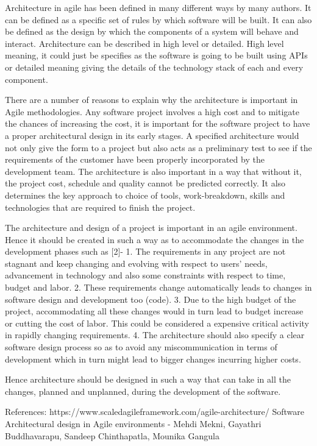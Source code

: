 Architecture in agile has been defined in many different ways by many authors. It can be defined as a specific set of rules by which software will be built. It can also be defined as the design by which the components of a system will behave and interact. Architecture can be described in high level or detailed. High level meaning, it could just be specifies as the software is going to be built using APIs or detailed meaning giving the details of the technology stack of each and every component.

There are a number of reasons to explain why the architecture is important in Agile methodologies. Any software project involves a high cost and to mitigate the chances of increasing the cost, it is important for the software project to have a proper architectural design in its early stages. A specified architecture would not only give the form to a project but also acts as a preliminary test to see if the requirements of the customer have been properly incorporated by the development team. The architecture is also important in a way that without it, the project cost, schedule and quality cannot be predicted correctly. It also determines the key approach to choice of tools, work-breakdown, skills and technologies that are required to finish the project.

The architecture and design of a project is important in an agile environment. Hence it should be created in such a way as to accommodate the changes in the development phases such as [2]-
1. The requirements in any project are not stagnant and keep changing and evolving with respect to users’ needs, advancement in technology and also some constraints with respect to time, budget and labor.
2. These requirements change automatically leads to changes in software design and development too (code).
3. Due to the high budget of the project, accommodating all these changes would in turn lead to budget increase or cutting the cost of labor. This could be considered a expensive critical activity in rapidly changing requirements.
4. The architecture should also specify a clear software design process so as to avoid any miscommunication in terms of development which in turn might lead to bigger changes incurring higher costs.

Hence architecture should be designed in such a way that can take in all the changes, planned and unplanned, during the development of the software.

References:
https://www.scaledagileframework.com/agile-architecture/
Software Architectural design in Agile environments - Mehdi Mekni, Gayathri Buddhavarapu, Sandeep Chinthapatla, Mounika Gangula
